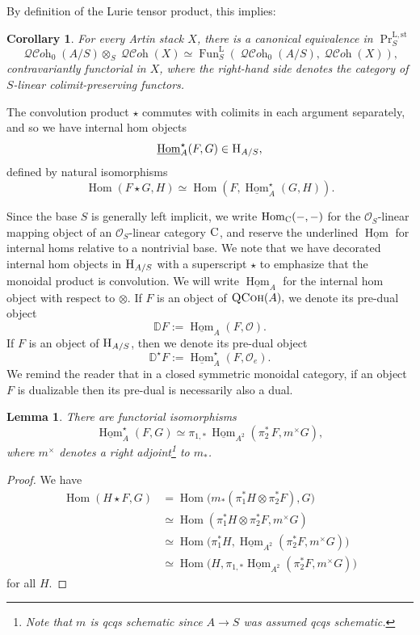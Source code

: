 \documentclass[12pt, oneside]{amsart}
\numberwithin{equation}{section}
\newtheorem{corollary}[subsubsection]{Corollary}
\newtheorem{lemma}[subsubsection]{Lemma}
\theoremstyle{remark}
\theoremstyle{plain}
\newcommand{\CC}{\textsc{C}}
\DeclareMathOperator{\QCoh}{\textsc{QCoh}}
\DeclareMathOperator{\QCOH}{\mathcal{QC}\textit{oh}}
\newcommand{\Hcat}{\textup{\textsc{H}}}
\newcommand{\HAS}{\Hcat_{A/S}}
\DeclareMathOperator{\Hom}{Hom}
\newcommand{\hhoms}{\underline{\operatorname{Hom}}}
\newcommand{\OO}{\mathcal{O}}
\begin{document}
By definition of the Lurie tensor product, this implies:

\begin{corollary}\label{cor:HA (x) QCoh}
  For every Artin stack $X$, there is a canonical equivalence in $\operatorname{Pr}^{\mathrm{L,st}}_S$
  \[
    \QCOH_0(A/S) \otimes_S \QCOH(X)
    \simeq \operatorname{Fun}^{\mathrm{L}}_S(\QCOH_0(A/S), \QCOH(X)),
  \]
  contravariantly functorial in $X$, where the right-hand side denotes the category of $S$-linear colimit-preserving functors.
\end{corollary}

The convolution product $\star$ commutes with colimits in each argument separately, and so we have internal hom objects $$\hhoms_{A}^{\star}(F,G) \in \HAS,$$ defined by natural isomorphisms $$\Hom(F\star G,H)\simeq\Hom(F,\hhoms_{A}^{\star}(G,H)).$$

Since the base $S$ is generally left implicit, we write $\Hom_{\CC}(-,-)$ for the $\OO_S$-linear mapping object of an $\OO_S$-linear category $\CC$, and reserve the underlined $\hhoms$ for internal homs relative to a nontrivial base.
We note that we have decorated internal hom objects in $\HAS$ with a superscript $\star$ to emphasize that the monoidal product is convolution. We will write $\hhoms_{A}$ for the internal hom object with respect to $\otimes.$ If $F$ is an object of $\QCoh(A),$ we denote its pre-dual object $$\mathbb{D}F:=\hhoms_{A}(F,\mathcal{O}).$$ If $F$ is an object of $\HAS$, then we denote its pre-dual object $$\mathbb{D}^{\star}F:=\hhoms_{A}^{\star}(F,\mathcal{O}_{e}).$$ We remind the reader that in a closed symmetric monoidal category, if an object $F$ is dualizable then its pre-dual is necessarily also a dual.

\begin{lemma} There are functorial isomorphisms $$\hhoms_{A}^{\star}(F,G)\simeq \pi_{1,*}\,\hhoms_{A^{2}}(\pi_{2}^{*}\,F,m^{\times}G),$$ where $m^{\times}$ denotes a right adjoint\footnote{Note that $m$ is qcqs schematic since $A \to S$ was assumed qcqs schematic.} to $m_*$. \end{lemma}

\begin{proof} We have \begin{align*}
  \Hom(H\star F,G) &= \Hom\bigl(m_{*}(\pi_{1}^{*}H\otimes\pi_{2}^{*}F),G\bigr)\\
  &\simeq \Hom(\pi_{1}^{*}H\otimes\pi_{2}^{*}F,m^{\times}G)\\
  &\simeq \Hom\bigl(\pi_{1}^{*}H,\hhoms_{A^{2}}(\pi_{2}^{*}F,m^{\times}G)\bigr)\\
  &\simeq \Hom\bigl(H,\pi_{1,*}\hhoms_{A^{2}}(\pi_{2}^{*}F,m^{\times}G)\bigr)
\end{align*} for all $H$. \end{proof}
\end{document}
